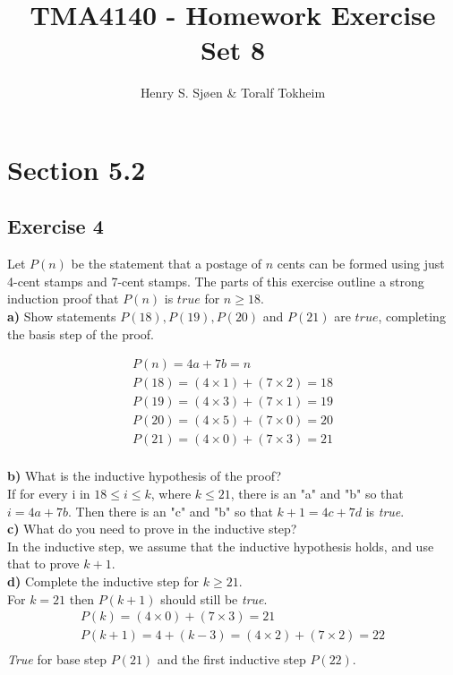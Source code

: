 \documentclass[12pt]{article}
\author{Henry S. Sjøen \& Toralf Tokheim}
\title{
  \textbf{TMA4140 - Homework Exercise Set 8}}
\begin{document}
    \maketitle
    \thispagestyle{empty}
    \pagebreak
    \tableofcontents
    \pagebreak

    \section{Section 5.2}
    \subsection{Exercise 4}
    Let $P(n)$ be the statement that a postage of $n$ cents can be formed using just 4-cent stamps and 7-cent stamps. The parts of this exercise outline a strong induction proof that $P(n)$ is $true$ for $n\geq 18$.\\
    
    \textbf{a)} Show statements $P(18),P(19),P(20)$ and $P(21)$ are $true$, completing the basis step of the proof.
    
    \begin{equation}
        \begin{split}
            P(n)=4a+7b=n\\
            P(18)=(4\times 1)+(7\times 2)=18\\
            P(19)=(4\times 3)+(7\times 1)=19\\
            P(20)=(4\times 5)+(7\times 0)=20\\
            P(21)=(4\times 0)+(7\times 3)=21\\
        \end{split}
    \end{equation}
    
    \textbf{b)} What is the inductive hypothesis of the proof?\\
    If for every i in $18 \leq i \leq k $, where $k \leq 21$, there is an "a" and "b" so that $i= 4a+7b$. Then there is an  "c" and "b" so that $k+1 = 4c+7d$ is \textit{true}.\\

    \textbf{c)} What do you need to prove in the inductive step?\\
    In the inductive step, we assume that the inductive hypothesis holds, and use that to prove $k+1$. \\
    
    \textbf{d)} Complete the inductive step for $k \geq 21$.\\
    For $k = 21$ then $P(k+1)$ should still be \textit{true}.
    \begin{equation}
        \begin{split}
                    P(k)=(4\times 0)+(7\times 3)=21\\
                    P(k+1)=4+(k-3)=(4\times 2)+(7\times 2)=22\\
        \end{split}
    \end{equation}
    \textit{True} for base step $P(21)$ and the first inductive step $P(22)$.\\
    
\end{document}
